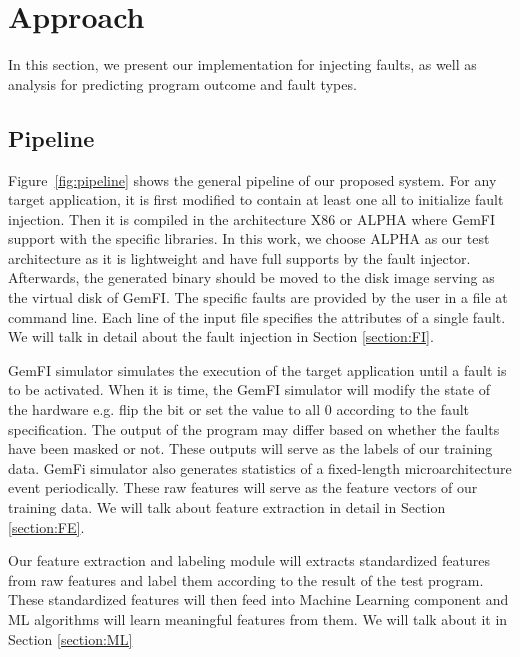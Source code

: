 \section{Approach}
In this section, we present our implementation for injecting faults, as well as analysis for predicting program outcome and fault types.

\subsection{Pipeline}
Figure~\ref{fig:pipeline} shows the general pipeline of our proposed system. For any target application, it is first modified to contain at least one all to initialize fault injection. Then it is compiled in the architecture X86 or ALPHA where GemFI support with the specific libraries. In this work, we choose ALPHA as our test architecture as it is lightweight and have full supports by the fault injector. Afterwards, the generated binary should be moved to the disk image serving as the virtual disk of GemFI. The specific faults are provided by the user in a file at command line. Each line of the input file specifies the attributes of a single fault. We will talk in detail about the fault injection in Section \ref{section:FI}. 

GemFI simulator simulates the execution of the target application until a fault is to be activated. When it is time, the GemFI simulator will modify the state of the hardware e.g. flip the bit or set the value to all 0 according to the fault specification. The output of the program may differ based on whether the faults have been masked or not. These outputs will serve as the labels of our training data. GemFi simulator also generates statistics of a fixed-length microarchitecture event periodically. These raw features will serve as the feature vectors of our training data. We will talk about feature extraction in detail in Section \ref{section:FE}. 

Our feature extraction and labeling module will extracts standardized features from raw features and label them according to the result of the test program. These standardized features will then feed into Machine Learning component and ML algorithms will learn meaningful features from them. We will talk about it in Section \ref{section:ML}

